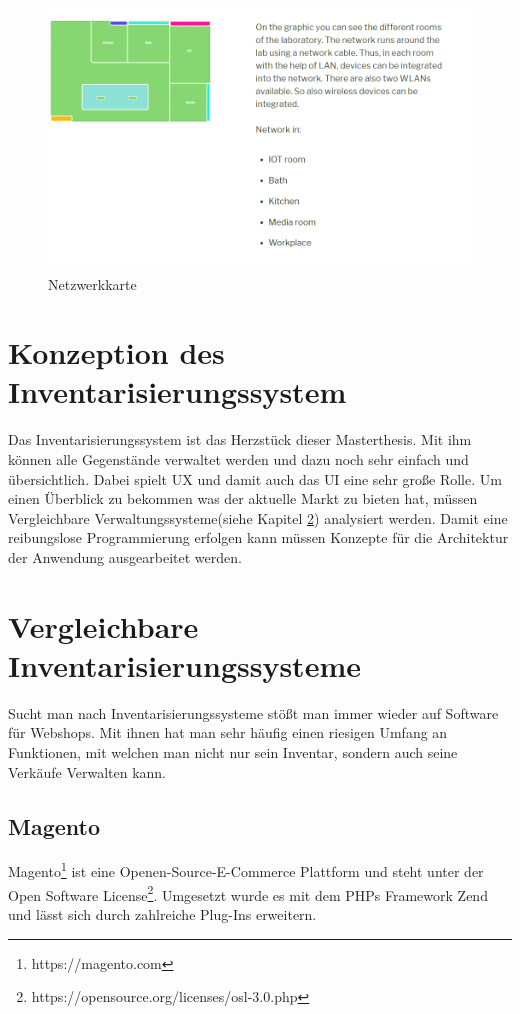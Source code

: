 \begin{figure}[bh]
	\centering
	\includegraphics[scale=0.35]{content/pictures/network.png}
	\caption{Netzwerkkarte}
	\label{fig:network}
\end{figure}

\section{Konzeption des Inventarisierungssystem}
\label{konzept:inventar}
Das Inventarisierungssystem ist das Herzstück dieser Masterthesis. Mit ihm können alle Gegenstände verwaltet werden und dazu noch sehr einfach und übersichtlich. Dabei spielt \acf{UX} und damit auch das \acf{UI} eine sehr große Rolle. Um einen Überblick zu bekommen was der aktuelle Markt zu bieten hat, müssen Vergleichbare Verwaltungssysteme(siehe Kapitel \ref{konzept:vergleich}) analysiert werden. Damit eine reibungslose Programmierung erfolgen kann müssen Konzepte für die Architektur der Anwendung ausgearbeitet werden.


\section{Vergleichbare Inventarisierungssysteme}
\label{konzept:vergleich}

Sucht man nach Inventarisierungssysteme stößt man immer wieder auf Software für Webshops. Mit ihnen hat man sehr häufig einen riesigen Umfang an Funktionen, mit welchen man nicht nur sein Inventar, sondern auch seine Verkäufe Verwalten kann.

\subsection{Magento}
\label{konzeption:magento}
Magento\footnote{https://magento.com} ist eine Openen-Source-E-Commerce Plattform und steht unter der Open Software License\footnote{https://opensource.org/licenses/osl-3.0.php}. Umgesetzt wurde es mit dem \acp{PHP} Framework Zend und lässt sich durch zahlreiche Plug-Ins erweitern.\autocite{.2018}

